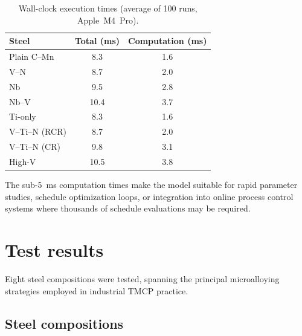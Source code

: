 \documentclass[11pt,a4paper]{article}
\begin{document}
\begin{table}[htbp]
\centering
\caption{Wall-clock execution times (average of 100 runs, Apple~M4~Pro).}
\label{tab:timing}
\begin{tabular}{@{}lSS@{}}
\toprule
Steel & {Total (ms)} & {Computation (ms)} \\
\midrule
Plain C--Mn       &  8.3 & 1.6 \\
V--N              &  8.7 & 2.0 \\
Nb                &  9.5 & 2.8 \\
Nb--V             & 10.4 & 3.7 \\
Ti-only           &  8.3 & 1.6 \\
V--Ti--N (RCR)    &  8.7 & 2.0 \\
V--Ti--N (CR)     &  9.8 & 3.1 \\
High-V            & 10.5 & 3.8 \\
\bottomrule
\end{tabular}
\end{table}

\noindent The sub-\SI{5}{\milli\second} computation times make the model
suitable for rapid parameter studies, schedule optimization loops, or
integration into online process control systems where thousands of schedule
evaluations may be required.

\section{Test results}
\label{sec:results}

Eight steel compositions were tested, spanning the principal microalloying
strategies employed in industrial TMCP practice.

\subsection{Steel compositions}
\end{document}
